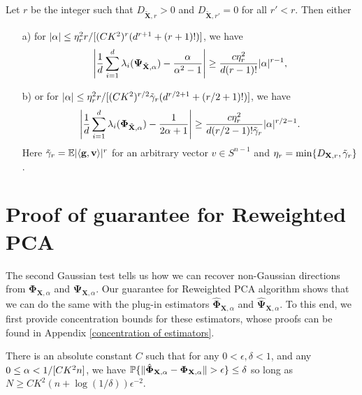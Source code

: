 \documentclass[final,12pt]{colt2018} %
\numberwithin{equation}{section}
\DeclarePairedDelimiter{\abs}{\lvert}{\rvert}
\DeclarePairedDelimiter{\norm}{\lVert}{\rVert}
\DeclarePairedDelimiter{\braces}{\lbrace}{\rbrace}
\DeclarePairedDelimiter{\inprod}{\langle}{\rangle}
\DeclarePairedDelimiter{\sqbracket}{[}{]}
\renewcommand{\P}{\mathbb{P}}
\newcommand{\E}{\mathbb{E}}
\newcommand{\boldg}{\textbf{g}}
\newcommand{\boldv}{\textbf{v}}
\newcommand{\boldPhi}{\boldsymbol{\Phi}}
\newcommand{\boldPsi}{\boldsymbol{\Psi}}
\newcommand{\boldX}{\textbf{X}}
\begin{document}
\begin{theorem} \label{thm: second Gaussian test, robust}
	Let $r$ be the integer such that $D_{\tilde{\boldX},r} > 0$ and $D_{\tilde{\boldX},r'} = 0$ for all $r' < r$. Then either
	\begin{enumerate}
		\item[a)] for $\abs{\alpha} \leq \eta_r^2 r/\sqbracket{(CK^2)^r(d^{r+1}+(r+1)!)}$, we have
		\begin{align}
		\abs*{\frac{1}{d}\sum_{i=1}^d\lambda_i(\boldPsi_{\tilde{\boldX},\alpha})-\frac{\alpha}{\alpha^2-1}} \geq \frac{c\eta_r^2}{d(r-1)!}\abs{\alpha}^{r-1},
		\end{align}
		\item[b)] or for $\abs{\alpha} \leq \eta_r^2 r/\sqbracket{(CK^2)^{r/2}\tilde{\gamma}_r(d^{r/2+1}+(r/2+1)!)}$, we have
		\begin{align}
		\abs*{\frac{1}{d}\sum_{i=1}^d\lambda_i(\boldPhi_{\tilde{\boldX},\alpha})-\frac{1}{2\alpha+1}} \geq \frac{c\eta_r^2}{d(r/2-1)!\tilde{\gamma}_r}\abs{\alpha}^{r/2-1}.
		\end{align}
		Here $\tilde{\gamma}_r = \E|\inprod{\boldg,\boldv}|^r$ for an arbitrary vector $v \in S^{n-1}$ 
		and $\eta_r = \min\braces{D_{\boldX,r}, \tilde{\gamma}_r}$.  
	\end{enumerate}
\end{theorem}

\section{Proof of guarantee for Reweighted PCA} \label{sec: proof of guarantee}

The second Gaussian test tells us how we can recover non-Gaussian directions from $\boldPhi_{\boldX,\alpha}$ and $\boldPsi_{\boldX,\alpha}$. Our guarantee for Reweighted PCA algorithm shows that we can do the same with the plug-in estimators $\hat{\boldPhi}_{\boldX,\alpha}$ and $\hat{\boldPsi}_{\boldX,\alpha}$. To this end, we first provide concentration bounds for these estimators, whose proofs can be found in Appendix \ref{concentration of estimators}.

\begin{theorem}[Concentration for $\hat{\boldPhi}_{\boldX,\alpha}$] \label{thm:Phi_concentration}
	There is an absolute constant $C$ such that for any $0 < \epsilon, \delta < 1$, and any $0 \leq \alpha < 1/\sqbracket{CK^2n}$, we have $\P\braces{\norm{\hat{\boldPhi}_{\boldX,\alpha} - \boldPhi_{\boldX,\alpha}} > \epsilon} \leq \delta$ so long as $N \geq CK^2(n+\log(1/\delta))\epsilon^{-2}$.
\end{theorem}
\end{document}
